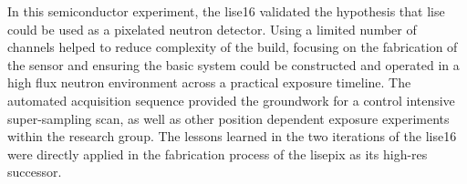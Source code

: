 \documentclass[../../../main.tex]{subfiles}%
\begin{document}
%
    \Xsubsection%
    In this semiconductor experiment, the \gls{lise16} validated the hypothesis that \gls{lise} could be used as a pixelated neutron detector.
    Using a limited number of channels helped to reduce complexity of the build, focusing on the fabrication of the sensor and ensuring the basic system could be constructed and operated in a high flux neutron environment across a practical exposure timeline.
    The automated acquisition sequence provided the groundwork for a control intensive \gls{super-sampling} scan, as well as other position dependent exposure experiments within the research group.
    The lessons learned in the two iterations of the \gls{lise16} were directly applied in the fabrication process of the \gls{lisepix} as its \gls{high-res} successor.
\end{document}
